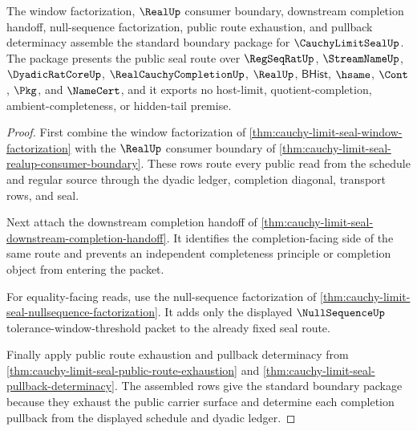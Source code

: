\begin{theorem}
\label{thm:cauchy-limit-seal-standard-boundary-package}
The window factorization, $\RealUp$ consumer boundary, downstream completion handoff, null-sequence factorization, public route exhaustion, and pullback determinacy assemble the standard boundary package for $\CauchyLimitSealUp$. The package presents the public seal route over $\RegSeqRatUp$, $\StreamNameUp$, $\DyadicRatCoreUp$, $\RealCauchyCompletionUp$, $\RealUp$, $\mathsf{BHist}$, $\hsame$, $\Cont$, $\Pkg$, and $\NameCert$, and it exports no host-limit, quotient-completion, ambient-completeness, or hidden-tail premise.
\end{theorem}
\begin{proof}
First combine the window factorization of \autoref{thm:cauchy-limit-seal-window-factorization} with the $\RealUp$ consumer boundary of \autoref{thm:cauchy-limit-seal-realup-consumer-boundary}. These rows route every public read from the schedule and regular source through the dyadic ledger, completion diagonal, transport rows, and seal.

Next attach the downstream completion handoff of \autoref{thm:cauchy-limit-seal-downstream-completion-handoff}. It identifies the completion-facing side of the same route and prevents an independent completeness principle or completion object from entering the packet.

For equality-facing reads, use the null-sequence factorization of \autoref{thm:cauchy-limit-seal-nullsequence-factorization}. It adds only the displayed $\NullSequenceUp$ tolerance-window-threshold packet to the already fixed seal route.

Finally apply public route exhaustion and pullback determinacy from \autoref{thm:cauchy-limit-seal-public-route-exhaustion} and \autoref{thm:cauchy-limit-seal-pullback-determinacy}. The assembled rows give the standard boundary package because they exhaust the public carrier surface and determine each completion pullback from the displayed schedule and dyadic ledger.
\end{proof}

